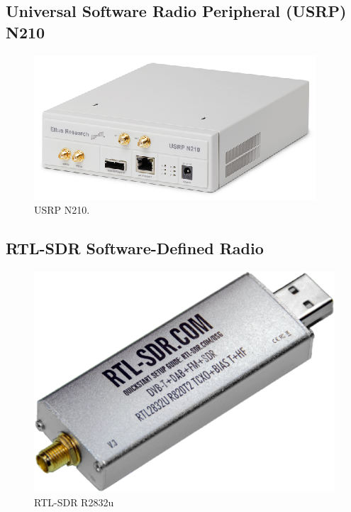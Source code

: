 \subsection{Universal Software Radio Peripheral (USRP) N210}

\begin{figure}[ht!]
	\centering
	\includegraphics[width=\textwidth,keepaspectratio]{images/Gill/figs/usrp.eps}
    \caption{USRP N210.} 
\label{usrp}      
\end{figure}

\subsection{RTL-SDR Software-Defined Radio}

\begin{figure}[ht!]
	\centering
	\includegraphics[width=\textwidth,keepaspectratio]{images/Gill/figs/rtlsdr.eps}
    \caption{RTL-SDR R2832u} 
\label{usrp}      
\end{figure}

